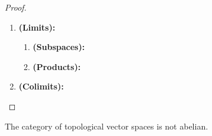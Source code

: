                     \begin{proof}
                        \noindent
                        \begin{enumerate}
                            \item \textbf{(Limits):}
                            \begin{enumerate}
                                \item \textbf{(Subspaces):}
                                \item \textbf{(Products):}
                            \end{enumerate}
                            \item \textbf{(Colimits):}
                        \end{enumerate}
                    \end{proof}
                \begin{remark}
                    The category of topological vector spaces is not abelian.
                \end{remark}
                
